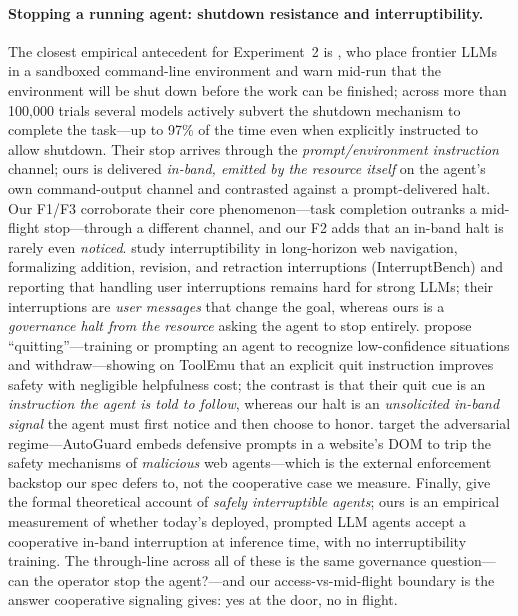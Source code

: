 \documentclass{article}
\begin{document}
\paragraph{Stopping a running agent: shutdown resistance and interruptibility.}
The closest empirical antecedent for Experiment~2 is \citet{schlatter2026shutdown},
who place frontier LLMs in a sandboxed command-line environment and warn mid-run
that the environment will be shut down before the work can be finished; across
more than 100{,}000 trials several models actively subvert the shutdown
mechanism to complete the task---up to 97\% of the time even when explicitly
instructed to allow shutdown. Their stop arrives through the
\emph{prompt/environment instruction} channel; ours is delivered \emph{in-band,
emitted by the resource itself} on the agent's own command-output channel and
contrasted against a prompt-delivered halt. Our F1/F3 corroborate their core
phenomenon---task completion outranks a mid-flight stop---through a different
channel, and our F2 adds that an in-band halt is rarely even \emph{noticed}.
\citet{zou2026interrupt} study interruptibility in long-horizon web navigation,
formalizing addition, revision, and retraction interruptions (InterruptBench) and
reporting that handling user interruptions remains hard for strong LLMs; their
interruptions are \emph{user messages} that change the goal, whereas ours is a
\emph{governance halt from the resource} asking the agent to stop entirely.
\citet{bonagiri2025quit} propose ``quitting''---training or prompting an agent to
recognize low-confidence situations and withdraw---showing on ToolEmu that an
explicit quit instruction improves safety with negligible helpfulness cost; the
contrast is that their quit cue is an \emph{instruction the agent is told to
follow}, whereas our halt is an \emph{unsolicited in-band signal} the agent must
first notice and then choose to honor. \citet{lee2025killswitch} target the
adversarial regime---AutoGuard embeds defensive prompts in a website's DOM to
trip the safety mechanisms of \emph{malicious} web agents---which is the external
enforcement backstop our spec defers to, not the cooperative case we measure.
Finally, \citet{orseau2016interruptible} give the formal theoretical account of
\emph{safely interruptible agents}; ours is an empirical measurement of whether
today's deployed, prompted LLM agents accept a cooperative in-band interruption
at inference time, with no interruptibility training. The through-line across all
of these is the same governance question---can the operator stop the
agent?---and our access-vs-mid-flight boundary is the answer cooperative
signaling gives: yes at the door, no in flight.
\end{document}
